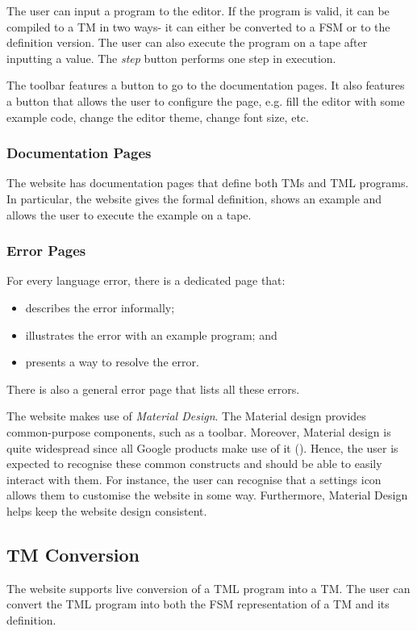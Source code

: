 The user can input a program to the editor. If the program is valid, it can be compiled to a TM in two ways- it can either be converted to a FSM or to the definition version. The user can also execute the program on a tape after inputting a value. The \emph{step} button performs one step in execution. 

The toolbar features a button to go to the documentation pages. It also features a button that allows the user to configure the page, e.g. fill the editor with some example code, change the editor theme, change font size, etc. 

\subsubsection{Documentation Pages}
The website has documentation pages that define both TMs and TML programs. In particular, the website gives the formal definition, shows an example and allows the user to execute the example on a tape.

\subsubsection{Error Pages}
For every language error, there is a dedicated page that:
\begin{itemize}
    \item describes the error informally;
    \item illustrates the error with an example program; and 
    \item presents a way to resolve the error.
\end{itemize}
There is also a general error page that lists all these errors.

The website makes use of \emph{Material Design}. The Material design provides common-purpose components, such as a toolbar. Moreover, Material design is quite widespread since all Google products make use of it (\cite{material_design}). Hence, the user is expected to recognise these common constructs and should be able to easily interact with them. For instance, the user can recognise that a settings icon allows them to customise the website in some way. Furthermore, Material Design helps keep the website design consistent.

\subsection{TM Conversion}
The website supports live conversion of a TML program into a TM. The user can convert the TML program into both the FSM representation of a TM and its definition.

